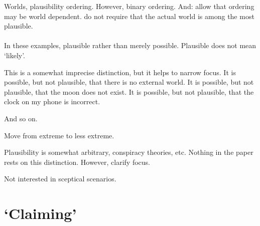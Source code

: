 \begin{note}
  Worlds, plausibility ordering.
  However, binary ordering.
  And:
  allow that ordering may be world dependent.
  do not require that the actual world is among the most plausible.
\end{note}

\paragraph{}

\begin{note}
  In these examples, plausible rather than merely possible.
  Plausible does not mean `likely'.

  This is a somewhat imprecise distinction, but it helps to narrow focus.
  It is possible, but not plausible, that there is no external world.
  It is possible, but not plausible, that the moon does not exist.
  It is possible, but not plausible, that the clock on my phone is incorrect.

  And so on.

  Move from extreme to less extreme.

  Plausibility is somewhat arbitrary, conspiracy theories, etc.
  Nothing in the paper rests on this distinction.
  However, clarify focus.
\end{note}

\begin{note}
  Not interested in sceptical scenarios.
\end{note}

\section{`Claiming'}
\label{sec:claiming}

